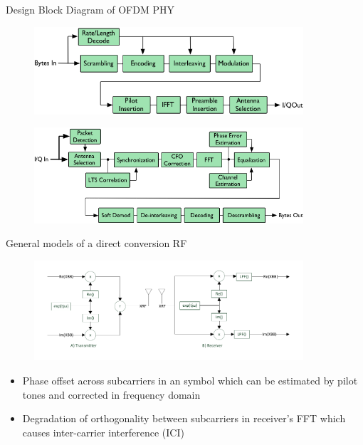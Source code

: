 \documentclass{beamer}
\begin{document}
\begin{frame}{Design Block Diagram of OFDM PHY}

\begin{figure}
\centering
\includegraphics[width=10cm]{content/fig/wlan_phy_tx_blk_diag.png}
\end{figure}

\begin{figure}
\centering
\includegraphics[width=10cm]{content/fig/wlan_phy_rx_blk_diag.png}
\end{figure}

\end{frame}


\begin{frame}{General models of a direct conversion RF}
\begin{figure}[h!]
\centering
\includegraphics[width=10cm]{content/fig/drct_rf_mdl.pdf}
\end{figure}

  \begin{itemize}
   
  \item {
Phase offset across subcarriers in an symbol which can be  estimated by pilot tones and corrected in frequency domain  
}
  
  \item {  
Degradation of orthogonality between subcarriers in receiver's FFT which causes inter-carrier interference (ICI)
  }
  
  \end{itemize}
  
\end{frame}
\end{document}
